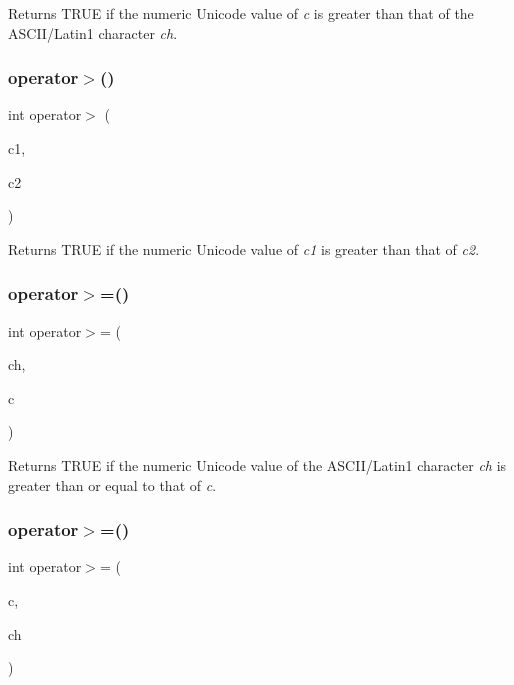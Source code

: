 Returns T\+R\+UE if the numeric Unicode value of {\itshape c} is greater than that of the A\+S\+C\+I\+I/\+Latin1 character {\itshape ch}. \mbox{\label{class_q_char_abc2415ff906b00a6fd8fda1587a5a8de}} 
\subsubsection{\texorpdfstring{operator$>$()}{operator>()}\hspace{0.1cm}{\footnotesize\ttfamily [3/3]}}
{\footnotesize\ttfamily int operator$>$ (\begin{DoxyParamCaption}\item[{\mbox{\hyperlink{class_q_char}{Q\+Char}}}]{c1,  }\item[{\mbox{\hyperlink{class_q_char}{Q\+Char}}}]{c2 }\end{DoxyParamCaption})\hspace{0.3cm}{\ttfamily [related]}}

Returns T\+R\+UE if the numeric Unicode value of {\itshape c1} is greater than that of {\itshape c2}. \mbox{\label{class_q_char_acaf747a14f95126f00a60b1e25826449}} 
\subsubsection{\texorpdfstring{operator$>$=()}{operator>=()}\hspace{0.1cm}{\footnotesize\ttfamily [1/3]}}
{\footnotesize\ttfamily int operator$>$= (\begin{DoxyParamCaption}\item[{char}]{ch,  }\item[{\mbox{\hyperlink{class_q_char}{Q\+Char}}}]{c }\end{DoxyParamCaption})\hspace{0.3cm}{\ttfamily [related]}}

Returns T\+R\+UE if the numeric Unicode value of the A\+S\+C\+I\+I/\+Latin1 character {\itshape ch} is greater than or equal to that of {\itshape c}. \mbox{\label{class_q_char_a76a11bfd8c91c16da6b67111e0f425f5}} 
\subsubsection{\texorpdfstring{operator$>$=()}{operator>=()}\hspace{0.1cm}{\footnotesize\ttfamily [2/3]}}
{\footnotesize\ttfamily int operator$>$= (\begin{DoxyParamCaption}\item[{\mbox{\hyperlink{class_q_char}{Q\+Char}}}]{c,  }\item[{char}]{ch }\end{DoxyParamCaption})\hspace{0.3cm}{\ttfamily [related]}}

